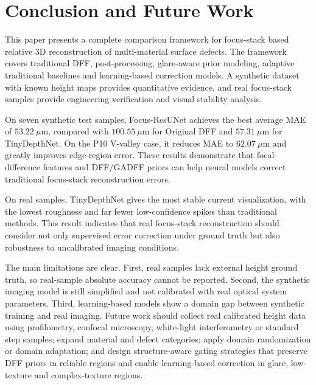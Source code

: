 \documentclass[11pt,a4paper]{article}
\begin{document}
\section{Conclusion and Future Work}

This paper presents a complete comparison framework for focus-stack based relative 3D reconstruction of multi-material surface defects. The framework covers traditional DFF, post-processing, glare-aware prior modeling, adaptive traditional baselines and learning-based correction models. A synthetic dataset with known height maps provides quantitative evidence, and real focus-stack samples provide engineering verification and visual stability analysis.

On seven synthetic test samples, Focus-ResUNet achieves the best average MAE of \(53.22~\mu\mathrm{m}\), compared with \(100.55~\mu\mathrm{m}\) for Original DFF and \(57.31~\mu\mathrm{m}\) for TinyDepthNet. On the P10 V-valley case, it reduces MAE to \(62.07~\mu\mathrm{m}\) and greatly improves edge-region error. These results demonstrate that focal-difference features and DFF/GADFF priors can help neural models correct traditional focus-stack reconstruction errors.

On real samples, TinyDepthNet gives the most stable current visualization, with the lowest roughness and far fewer low-confidence spikes than traditional methods. This result indicates that real focus-stack reconstruction should consider not only supervised error correction under ground truth but also robustness to uncalibrated imaging conditions.

The main limitations are clear. First, real samples lack external height ground truth, so real-sample absolute accuracy cannot be reported. Second, the synthetic imaging model is still simplified and not calibrated with real optical system parameters. Third, learning-based models show a domain gap between synthetic training and real imaging. Future work should collect real calibrated height data using profilometry, confocal microscopy, white-light interferometry or standard step samples; expand material and defect categories; apply domain randomization or domain adaptation; and design structure-aware gating strategies that preserve DFF priors in reliable regions and enable learning-based correction in glare, low-texture and complex-texture regions.
\end{document}
